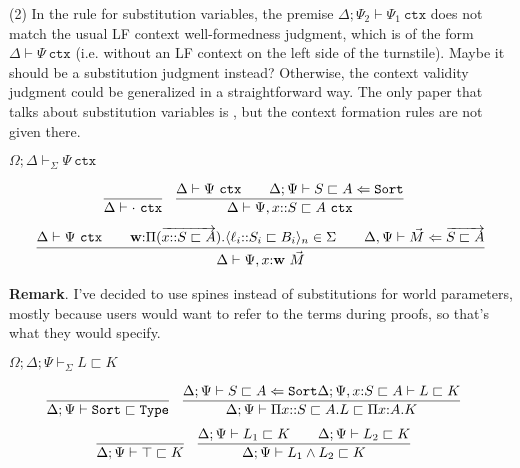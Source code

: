 \documentclass[letterpaper, 11pt]{article}
\newcommand{\Lar}{\Leftarrow}
\newcommand{\Type}{\texttt{Type}}
\newcommand{\Sort}{\texttt{Sort}}
\newcommand{\ctx}{\texttt{ctx}}
\begin{document}
    (2) In the rule for substitution variables, the premise $\Delta ; \Psi_2 \vdash \Psi_1 \ \ctx$ does not match the usual LF context well-formedness
    judgment, which is of the form $\Delta \vdash \Psi \ \ctx$ (i.e. without an LF context on the left side of the turnstile).  Maybe it should be
    a substitution judgment instead?  Otherwise, the context validity judgment could be generalized in a straightforward way. The only paper that 
    talks about substitution variables is \cite{Pientka2008}, but the context formation rules are not given there.

    $\boxed{\Omega ; \Delta \vdash_\Sigma \Psi \ \ctx}$

    \begin{align*}
      & \infer{\Delta \vdash \cdot \ \ctx}{} &
      & \infer{\Delta \vdash \Psi, x {::}S \sqsubset A \ \ctx}
        {
          \Delta \vdash \Psi \ \ctx
          &&
          \Delta ; \Psi \vdash S \sqsubset A \Lar \Sort
        }
    \end{align*}
    \begin{align*}
      \infer{\Delta \vdash \Psi, x{:} \textbf{w} \ \vec{M}}
            {
              \Delta \vdash \Psi \ \ctx
              &&
              \textbf{w} {:} \Pi (\overrightarrow{x{::}S \sqsubset A}).\langle \ell_i {::} S_i \sqsubset B_i \rangle_n \in \Sigma
              &&
              \Delta, \Psi \vdash \vec{M} \Lar \overrightarrow{S \sqsubset A}
            }
    \end{align*}

    \textbf{Remark}.  I've decided to use spines instead of substitutions for world parameters, mostly because users would want to refer to
    the terms during proofs, so that's what they would specify.

    $\boxed{\Omega; \Delta; \Psi \vdash_\Sigma L \sqsubset K}$
    
    \begin{align*}
      & \infer{\Delta ; \Psi \vdash \Sort \sqsubset \Type}{} &
      & \infer{\Delta ; \Psi \vdash \Pi x{::}S \sqsubset A.L \sqsubset \Pi x{:}A.K}
        {
          \Delta ; \Psi \vdash S \sqsubset A \Lar \Sort
          \Delta ; \Psi, x {:} S \sqsubset A \vdash L \sqsubset K
        }
    \end{align*}
    \begin{align*}
      & \infer{\Delta ; \Psi \vdash \top \sqsubset K}{} &
      & \infer{\Delta ; \Psi \vdash L_1 \land L_2 \sqsubset K}
        {
          \Delta ; \Psi  \vdash L_1 \sqsubset K
          &&
          \Delta ; \Psi  \vdash L_2 \sqsubset K
        }
    \end{align*}
\end{document}
